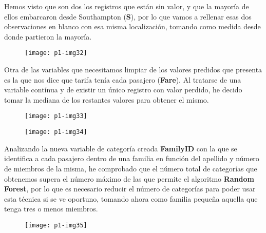 \documentclass[10pt]{article}
\begin{document}
Hemos visto que son dos los registros que están sin valor, y que la mayoría de ellos embarcaron desde Southampton (\textbf{S}), por lo que vamos a rellenar esas dos observaciones en blanco con esa misma localización, tomando como medida desde donde partieron la mayoría.\\

\begin{figure}[H]
	\begin{center}
 		\texttt{[image: p1-img32]}
	\end{center} 
\end{figure} 

Otra de las variables que necesitamos limpiar de los valores predidos que presenta es la que nos dice que tarifa tenía cada pasajero (\textbf{Fare}). Al tratarse de una variable contínua y de existir un único registro con valor perdido, he decido tomar la mediana de los restantes valores para obtener el mismo.  \\

\begin{figure}[H]
	\begin{center}
 		\texttt{[image: p1-img33]}
	\end{center} 
\end{figure} 

\begin{figure}[H]
	\begin{center}
 		\texttt{[image: p1-img34]}
	\end{center} 
\end{figure} 

 
Analizando la nueva variable de categoría creada \textbf{FamilyID} con la que se identifica a cada pasajero dentro de una familia en función del apellido y número de miembros de la misma, he comprobado que el número total de categorías que obtenemos supera el número máximo de las que permite el algoritmo \textbf{Random Forest}, por lo que es necesario reducir el número de categorías para poder usar esta técnica si se ve oportuno, tomando ahora como familia pequeña aquella que tenga tres o menos miembros.\\

\begin{figure}[H]
	\begin{center}
 		\texttt{[image: p1-img35]}
	\end{center} 
\end{figure} 
\end{document}

